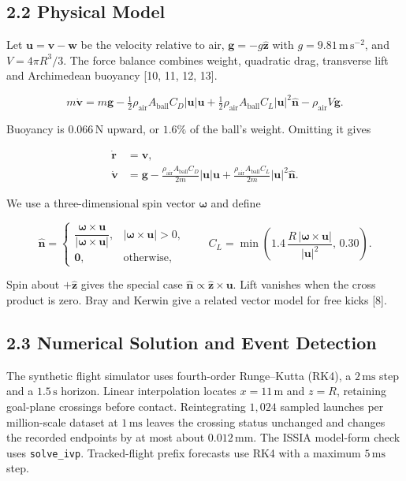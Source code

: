 \subsection{2.2 Physical Model}

Let $\mathbf u=\mathbf v-\mathbf w$ be the velocity relative to air, $\mathbf g=-g\hat{\mathbf z}$ with $g=9.81\,\mathrm{m\,s^{-2}}$, and $V=4\pi R^3/3$. The force balance combines weight, quadratic drag, transverse lift and Archimedean buoyancy [10, 11, 12, 13].

$$
m\dot{\mathbf v}=m\mathbf g-\tfrac12\rho_{\mathrm{air}} A_{\mathrm{ball}} C_D|\mathbf u|\mathbf u
  +\tfrac12\rho_{\mathrm{air}} A_{\mathrm{ball}} C_L|\mathbf u|^2\hat{\mathbf n}-\rho_{\mathrm{air}} V\mathbf g.
$$

Buoyancy is $0.066\,\mathrm{N}$ upward, or $1.6\%$ of the ball's weight. Omitting it gives

$$
\begin{aligned}
\dot{\mathbf r}&=\mathbf v,\\
  \dot{\mathbf v}&=\mathbf g-\frac{\rho_{\mathrm{air}} A_{\mathrm{ball}} C_D}{2m}|\mathbf u|\mathbf u
    +\frac{\rho_{\mathrm{air}} A_{\mathrm{ball}} C_L}{2m}|\mathbf u|^2\hat{\mathbf n}.
\end{aligned}
$$

We use a three-dimensional spin vector $\boldsymbol\omega$ and define

$$
\hat{\mathbf{n}}=
  \begin{cases}
    \dfrac{\boldsymbol{\omega}\times\mathbf{u}}{|\boldsymbol{\omega}\times\mathbf{u}|}, & |\boldsymbol{\omega}\times\mathbf{u}|>0,\\[2mm]
    \mathbf{0}, & \text{otherwise},
  \end{cases}
  \qquad
  C_L=\min\!\left(1.4\,\frac{R\,|\boldsymbol{\omega}\times\mathbf{u}|}{|\mathbf{u}|^2},\,0.30\right).
$$

Spin about $+\hat{\mathbf z}$ gives the special case $\hat{\mathbf n}\propto\hat{\mathbf z}\times\mathbf u$. Lift vanishes when the cross product is zero. Bray and Kerwin give a related vector model for free kicks [8].

\subsection{2.3 Numerical Solution and Event Detection}

The synthetic flight simulator uses fourth-order Runge--Kutta (RK4), a $2\,\mathrm{ms}$ step and a $1.5\,\mathrm{s}$ horizon. Linear interpolation locates $x=11\,\mathrm{m}$ and $z=R$, retaining goal-plane crossings before contact. Reintegrating $1{,}024$ sampled launches per million-scale dataset at $1\,\mathrm{ms}$ leaves the crossing status unchanged and changes the recorded endpoints by at most about $0.012\,\mathrm{mm}$. The ISSIA model-form check uses \texttt{solve\_ivp}. Tracked-flight prefix forecasts use RK4 with a maximum $5\,\mathrm{ms}$ step.

